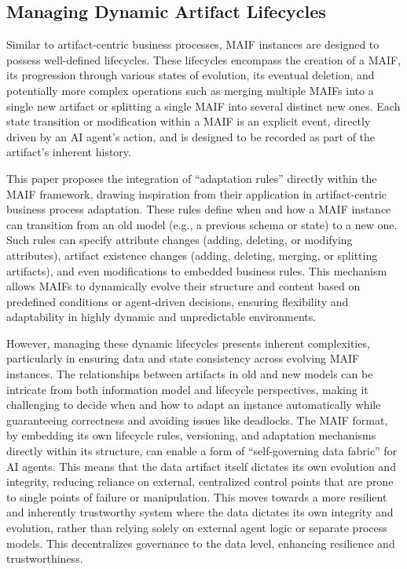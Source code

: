 \documentclass[conference]{IEEEtran}
\begin{document}
\subsection{Managing Dynamic Artifact Lifecycles}

Similar to artifact-centric business processes, MAIF instances are designed to possess well-defined lifecycles. These lifecycles encompass the creation of a MAIF, its progression through various states of evolution, its eventual deletion, and potentially more complex operations such as merging multiple MAIFs into a single new artifact or splitting a single MAIF into several distinct new ones\cite{ref12}. Each state transition or modification within a MAIF is an explicit event, directly driven by an AI agent's action, and is designed to be recorded as part of the artifact's inherent history.

This paper proposes the integration of ``adaptation rules'' directly within the MAIF framework, drawing inspiration from their application in artifact-centric business process adaptation\cite{ref12}. These rules define when and how a MAIF instance can transition from an old model (e.g., a previous schema or state) to a new one. Such rules can specify attribute changes (adding, deleting, or modifying attributes), artifact existence changes (adding, deleting, merging, or splitting artifacts), and even modifications to embedded business rules\cite{ref12}. This mechanism allows MAIFs to dynamically evolve their structure and content based on predefined conditions or agent-driven decisions, ensuring flexibility and adaptability in highly dynamic and unpredictable environments.

However, managing these dynamic lifecycles presents inherent complexities, particularly in ensuring data and state consistency across evolving MAIF instances\cite{ref12}. The relationships between artifacts in old and new models can be intricate from both information model and lifecycle perspectives, making it challenging to decide when and how to adapt an instance automatically while guaranteeing correctness and avoiding issues like deadlocks\cite{ref12}. The MAIF format, by embedding its own lifecycle rules, versioning, and adaptation mechanisms directly within its structure, can enable a form of ``self-governing data fabric'' for AI agents. This means that the data artifact itself dictates its own evolution and integrity, reducing reliance on external, centralized control points that are prone to single points of failure or manipulation. This moves towards a more resilient and inherently trustworthy system where the data dictates its own integrity and evolution, rather than relying solely on external agent logic or separate process models. This decentralizes governance to the data level, enhancing resilience and trustworthiness.
% 
\end{document}
